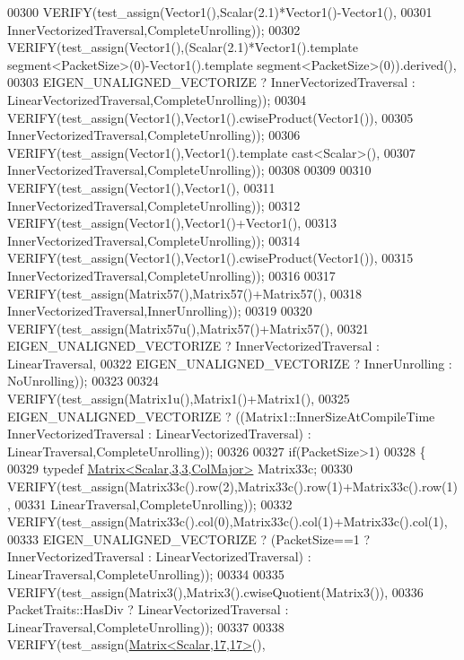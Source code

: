 \begin{DoxyCode}
00300     VERIFY(test\_assign(Vector1(),Scalar(2.1)*Vector1()-Vector1(),
00301       InnerVectorizedTraversal,CompleteUnrolling));
00302     VERIFY(test\_assign(Vector1(),(Scalar(2.1)*Vector1().\textcolor{keyword}{template} segment<PacketSize>(0)-Vector1().\textcolor{keyword}{template} 
      segment<PacketSize>(0)).derived(),
00303       EIGEN\_UNALIGNED\_VECTORIZE ? InnerVectorizedTraversal : LinearVectorizedTraversal,CompleteUnrolling));
00304     VERIFY(test\_assign(Vector1(),Vector1().cwiseProduct(Vector1()),
00305       InnerVectorizedTraversal,CompleteUnrolling));
00306     VERIFY(test\_assign(Vector1(),Vector1().\textcolor{keyword}{template} cast<Scalar>(),
00307       InnerVectorizedTraversal,CompleteUnrolling));
00308 
00309 
00310     VERIFY(test\_assign(Vector1(),Vector1(),
00311       InnerVectorizedTraversal,CompleteUnrolling));
00312     VERIFY(test\_assign(Vector1(),Vector1()+Vector1(),
00313       InnerVectorizedTraversal,CompleteUnrolling));
00314     VERIFY(test\_assign(Vector1(),Vector1().cwiseProduct(Vector1()),
00315       InnerVectorizedTraversal,CompleteUnrolling));
00316 
00317     VERIFY(test\_assign(Matrix57(),Matrix57()+Matrix57(),
00318       InnerVectorizedTraversal,InnerUnrolling));
00319 
00320     VERIFY(test\_assign(Matrix57u(),Matrix57()+Matrix57(),
00321       EIGEN\_UNALIGNED\_VECTORIZE ? InnerVectorizedTraversal : LinearTraversal,
00322       EIGEN\_UNALIGNED\_VECTORIZE ? InnerUnrolling : NoUnrolling));
00323 
00324     VERIFY(test\_assign(Matrix1u(),Matrix1()+Matrix1(),
00325       EIGEN\_UNALIGNED\_VECTORIZE ? ((Matrix1::InnerSizeAtCompileTime %
      InnerVectorizedTraversal : LinearVectorizedTraversal) : LinearTraversal,CompleteUnrolling));
00326         
00327     \textcolor{keywordflow}{if}(PacketSize>1)
00328     \{
00329       \textcolor{keyword}{typedef} \hyperlink{group___core___module_class_eigen_1_1_matrix}{Matrix<Scalar,3,3,ColMajor>} Matrix33c;
00330       VERIFY(test\_assign(Matrix33c().row(2),Matrix33c().row(1)+Matrix33c().row(1),
00331         LinearTraversal,CompleteUnrolling));
00332       VERIFY(test\_assign(Matrix33c().col(0),Matrix33c().col(1)+Matrix33c().col(1),
00333         EIGEN\_UNALIGNED\_VECTORIZE ? (PacketSize==1 ? InnerVectorizedTraversal : LinearVectorizedTraversal) 
      : LinearTraversal,CompleteUnrolling));
00334               
00335       VERIFY(test\_assign(Matrix3(),Matrix3().cwiseQuotient(Matrix3()),
00336         PacketTraits::HasDiv ? LinearVectorizedTraversal : LinearTraversal,CompleteUnrolling));
00337         
00338       VERIFY(test\_assign(\hyperlink{group___core___module_class_eigen_1_1_matrix}{Matrix<Scalar,17,17>}(),

\end{DoxyCode}
